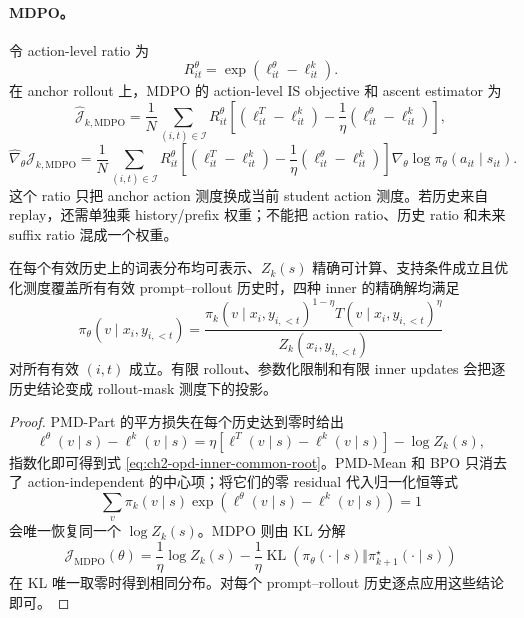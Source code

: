 \paragraph*{MDPO。}
令 action-level ratio 为
\[
 R^\theta_{it}=\exp(\ell^\theta_{it}-\ell^k_{it}).
\]
在 anchor rollout 上，MDPO 的 action-level IS objective 和 ascent estimator 为
\begin{equation}
\label{eq:ch2-opd-mdpo-explicit-objective}
 \widehat{\mathcal J}_{k,\mathrm{MDPO}}
 =\frac1N\sum_{(i,t)\in\mathcal I}R^\theta_{it}
 \left[(\ell^T_{it}-\ell^k_{it})
 -\frac1\eta(\ell^\theta_{it}-\ell^k_{it})\right],
\end{equation}
\begin{equation}
\label{eq:ch2-opd-mdpo-explicit-gradient}
 \widehat\nabla_\theta\mathcal J_{k,\mathrm{MDPO}}
 =\frac1N\sum_{(i,t)\in\mathcal I}R^\theta_{it}
 \left[(\ell^T_{it}-\ell^k_{it})
 -\frac1\eta(\ell^\theta_{it}-\ell^k_{it})\right]
 \nabla_\theta\log\pi_\theta(a_{it}\mid s_{it}).
\end{equation}
这个 ratio 只把 anchor action 测度换成当前 student action 测度。若历史来自 replay，还需单独乘 history/prefix 权重；不能把 action ratio、历史 ratio 和未来 suffix ratio 混成一个权重。

\begin{theorem}
\label{thm:ch2-opd-inner-common-root}
在每个有效历史上的词表分布均可表示、$Z_k(s)$ 精确可计算、支持条件成立且优化测度覆盖所有有效 prompt--rollout 历史时，四种 inner 的精确解均满足
\begin{equation}
\label{eq:ch2-opd-inner-common-root}
 \pi_\theta(v\mid x_i,y_{i,<t})
 =\frac{\pi_k(v\mid x_i,y_{i,<t})^{1-\eta}
 T(v\mid x_i,y_{i,<t})^\eta}
 {Z_k(x_i,y_{i,<t})}
\end{equation}
对所有有效 $(i,t)$ 成立。有限 rollout、参数化限制和有限 inner updates 会把逐历史结论变成 rollout-mask 测度下的投影。
\end{theorem}

\begin{proof}
PMD-Part 的平方损失在每个历史达到零时给出
\[
 \ell^\theta(v\mid s)-\ell^k(v\mid s)
 =\eta[\ell^T(v\mid s)-\ell^k(v\mid s)]-\log Z_k(s),
\]
指数化即可得到式 \eqref{eq:ch2-opd-inner-common-root}。PMD-Mean 和 BPO 只消去了 action-independent 的中心项；将它们的零 residual 代入归一化恒等式
\[
 \sum_v\pi_k(v\mid s)\exp(\ell^\theta(v\mid s)-\ell^k(v\mid s))=1
\]
会唯一恢复同一个 $\log Z_k(s)$。MDPO 则由 KL 分解
\[
 \mathcal J_{\mathrm{MDPO}}(\theta)
 =\frac1\eta\log Z_k(s)
 -\frac1\eta\operatorname{KL}(\pi_\theta(\cdot\mid s)\Vert
 \pi_{k+1}^{\star}(\cdot\mid s))
\]
在 KL 唯一取零时得到相同分布。对每个 prompt--rollout 历史逐点应用这些结论即可。
\end{proof}

